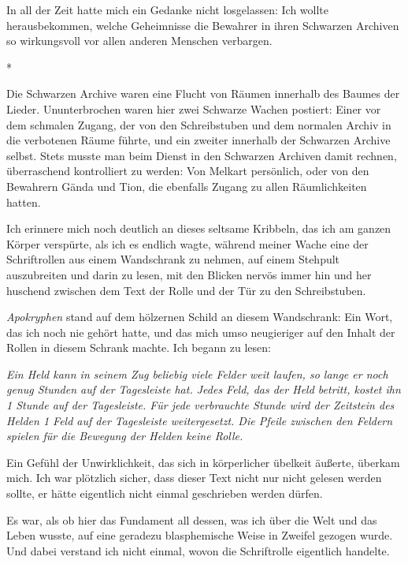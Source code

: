 \documentclass[10pt, a4paper, oneside]{book}
\begin{document}
\begin{multicols}{2}
In all der Zeit hatte mich ein Gedanke nicht losgelassen: Ich wollte herausbekommen, welche Geheimnisse die Bewahrer in ihren Schwarzen Archiven so wirkungsvoll vor allen anderen Menschen verbargen.

\begin{center}
    *
\end{center}

Die Schwarzen Archive waren eine Flucht von Räumen innerhalb des Baumes der Lieder. Ununterbrochen waren hier zwei Schwarze Wachen postiert: Einer vor dem schmalen Zugang, der von den Schreibstuben und dem normalen Archiv in die verbotenen Räume führte, und ein zweiter innerhalb der Schwarzen Archive selbst. Stets musste man beim Dienst in den Schwarzen Archiven damit rechnen, überraschend kontrolliert zu werden: Von Melkart persönlich, oder von den Bewahrern Gända und Tion, die ebenfalls Zugang zu allen Räumlichkeiten hatten.

Ich erinnere mich noch deutlich an dieses seltsame Kribbeln, das ich am ganzen Körper verspürte, als ich es endlich wagte, während meiner Wache eine der Schriftrollen aus einem Wandschrank zu nehmen, auf einem Stehpult auszubreiten und darin zu lesen, mit den Blicken nervös immer hin und her huschend zwischen dem Text der Rolle und der Tür zu den Schreibstuben.

\textit{Apokryphen} stand auf dem hölzernen Schild an diesem Wandschrank: Ein Wort, das ich noch nie gehört hatte, und das mich umso neugieriger auf den Inhalt der Rollen in diesem Schrank machte. Ich begann zu lesen:

\textit{Ein Held kann in seinem Zug beliebig viele Felder weit laufen, so lange er noch genug Stunden auf der Tagesleiste hat. Jedes Feld, das der Held betritt, kostet ihn 1 Stunde auf der Tagesleiste. Für jede verbrauchte Stunde wird der Zeitstein des Helden 1 Feld auf der Tagesleiste weitergesetzt. Die Pfeile zwischen den Feldern spielen für die Bewegung der Helden keine Rolle.}

Ein Gefühl der Unwirklichkeit, das sich in körperlicher übelkeit äußerte, überkam mich. Ich war plötzlich sicher, dass dieser Text nicht nur nicht gelesen werden sollte, er hätte eigentlich nicht einmal geschrieben werden dürfen.

Es war, als ob hier das Fundament all dessen, was ich über die Welt und das Leben wusste, auf eine geradezu blasphemische Weise in Zweifel gezogen wurde. Und dabei verstand ich nicht einmal, wovon die Schriftrolle eigentlich handelte.


\end{multicols}
\end{document}
